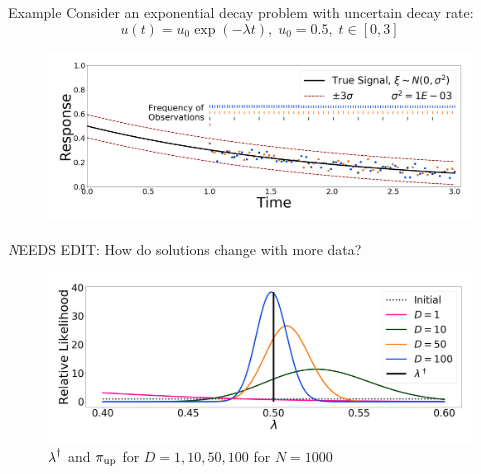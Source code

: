 \begin{block}{Example}
\centering
    Consider an exponential decay problem with uncertain decay rate:
   \begin{equation*}
       u(t) = u_0\exp(-\lambda t), \; u_0 = 0.5 ,\; t\in[0,3]
   \end{equation*}
\vspace{-0.5cm}
    \begin{figure}
        \includegraphics[width=26cm]{figures/exponential_decay_response_sigma-10E-4}
    \end{figure}


\vspace{1cm}

\centering
{}
{\emph NEEDS EDIT: How do solutions change with more data?}
\vspace{-0.5cm}
    \begin{figure}
        \includegraphics[width=26cm]{figures/updated_convergence_sigma-10E-4}
        \vspace{-0.5cm}
        \caption{ $\operatorname*{\lambda}^\dagger$ and $\operatorname*{\pi_{up}}$ for $D=1, 10, 50, 100$ for $N=1000$}
    \end{figure}



\end{block}
